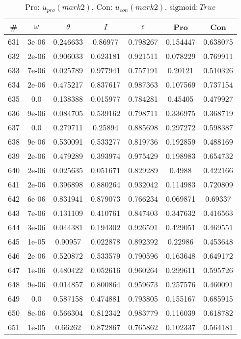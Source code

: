 \newpage
\begin{table}
\caption{Pro: $u_{pro} (mark 2)$, Con: $u_{con} (mark 2)$, $\mathrm{sigmoid}: True$}
\begin{tabular*}{\linewidth}{c|c|c|c|c|c|c}
\# & $\omega$ & $\theta$ & $I$ & $\epsilon$ & Pro & Con \\
\hline
631 & 3e-06 & 0.246633 & 0.86977 & 0.798267 & 0.154447 & 0.638075\\
632 & 2e-06 & 0.906033 & 0.623181 & 0.921511 & 0.078229 & 0.769911\\
633 & 7e-06 & 0.025789 & 0.977941 & 0.757191 & 0.20121 & 0.510326\\
634 & 2e-06 & 0.475217 & 0.837617 & 0.987363 & 0.107569 & 0.737154\\
635 & 0.0 & 0.138388 & 0.015977 & 0.784281 & 0.45405 & 0.479927\\
636 & 9e-06 & 0.084705 & 0.539162 & 0.798711 & 0.336975 & 0.368719\\
637 & 0.0 & 0.279711 & 0.25894 & 0.885698 & 0.297272 & 0.598387\\
638 & 9e-06 & 0.530091 & 0.533277 & 0.819736 & 0.192859 & 0.488169\\
639 & 2e-06 & 0.479289 & 0.393974 & 0.975429 & 0.198983 & 0.654732\\
640 & 2e-06 & 0.025635 & 0.051671 & 0.829289 & 0.4988 & 0.422166\\
641 & 2e-06 & 0.396898 & 0.880264 & 0.932042 & 0.114983 & 0.720809\\
642 & 6e-06 & 0.831941 & 0.879073 & 0.766234 & 0.069871 & 0.69337\\
643 & 7e-06 & 0.131109 & 0.410761 & 0.847403 & 0.347632 & 0.416563\\
644 & 3e-06 & 0.044381 & 0.194302 & 0.926591 & 0.429051 & 0.469551\\
645 & 1e-05 & 0.90957 & 0.022878 & 0.892392 & 0.22986 & 0.453648\\
646 & 2e-06 & 0.520872 & 0.533579 & 0.790596 & 0.163648 & 0.649172\\
647 & 1e-06 & 0.480422 & 0.052616 & 0.960264 & 0.299611 & 0.595726\\
648 & 9e-06 & 0.014857 & 0.800864 & 0.959673 & 0.257576 & 0.460091\\
649 & 0.0 & 0.587158 & 0.474881 & 0.793805 & 0.155167 & 0.685915\\
650 & 8e-06 & 0.566304 & 0.812342 & 0.983779 & 0.116039 & 0.618782\\
651 & 1e-05 & 0.66262 & 0.872867 & 0.765862 & 0.102337 & 0.564181\\

\end{tabular*}
\end{table}
